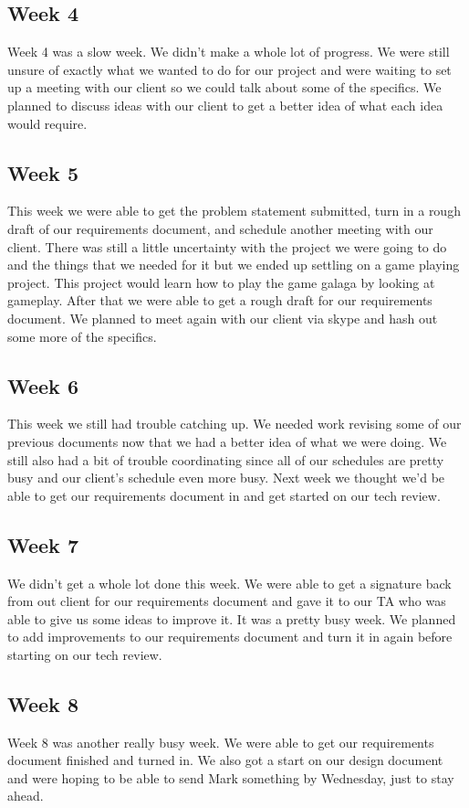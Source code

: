 \documentclass[onecolumn, draftclsnofoot,10pt, compsoc]{IEEEtran}
\begin{document}
\subsection{Week 4}
Week 4 was a slow week.
We didn't make a whole lot of progress.
We were still unsure of exactly what we wanted to do for our project and were waiting to set up a meeting with our client so we could talk about some of the specifics.
We planned to discuss ideas with our client to get a better idea of what each idea would require.

\subsection{Week 5}
This week we were able to get the problem statement submitted, turn in a rough draft of our requirements document, and schedule another meeting with our client.
There was still a little uncertainty with the project we were going to do and the things that we needed for it but we ended up settling on a game playing project.
This project would learn how to play the game galaga by looking at gameplay.
After that we were able to get a rough draft for our requirements document.
We planned to meet again with our client via skype and hash out some more of the specifics.

\subsection{Week 6}
This week we still had trouble catching up.
We needed work revising some of our previous documents now that we had a better idea of what we were doing.
We still also had a bit of trouble coordinating since all of our schedules are pretty busy and our client's schedule even more busy.
Next week we thought we'd be able to get our requirements document in and get started on our tech review.

\subsection{Week 7}
We didn't get a whole lot done this week.
We were able to get a signature back from out client for our requirements document and gave it to our TA who was able to give us some ideas to improve it.
It was a pretty busy week.
We planned to add improvements to our requirements document and turn it in again before starting on our tech review.

\subsection{Week 8}
Week 8 was another really busy week.
We were able to get our requirements document finished and turned in.
We also got a start on our design document and were hoping to be able to send Mark something by Wednesday, just to stay ahead.
\end{document}
